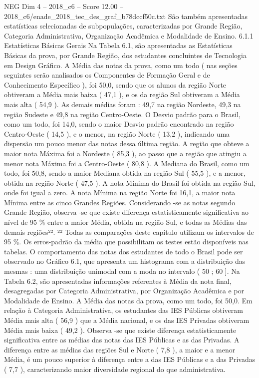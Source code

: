 \begin{textsample}{NEG Dim 4 – 2018\_c6 – Score 12.00 – 2018\_c6/enade\_2018\_tec\_des\_graf\_b78dccf50c.txt}
São também apresentadas estatísticas selecionadas de subpopulações, caracterizadas por Grande Região, Categoria Administrativa, Organização Acadêmica e Modalidade de Ensino. 6.1.1 Estatísticas Básicas Gerais Na Tabela 6.1, são apresentadas as Estatísticas Básicas da prova, por Grande Região, dos estudantes concluintes de Tecnologia em Design Gráfico.
A Média das notas da prova, como um todo ( nas seções seguintes serão analisados os Componentes de Formação Geral e de Conhecimento Específico ), foi 50,0, sendo que os alunos da região Norte obtiveram a Média mais baixa ( 47,1 ), e os da região Sul obtiveram a Média mais alta ( 54,9 ).
As demais médias foram : 49,7 na região Nordeste, 49,3 na região Sudeste e 49,8 na região Centro-Oeste.
O Desvio padrão para o Brasil, como um todo, foi 14,0, sendo o maior Desvio padrão encontrado na região Centro-Oeste ( 14,5 ), e o menor, na região Norte ( 13,2 ), indicando uma dispersão um pouco menor das notas dessa última região.
A região que obteve a maior nota Máxima foi a Nordeste ( 85,3 ), ao passo que a região que atingiu a menor nota Máxima foi a Centro-Oeste ( 80,8 ).
A Mediana do Brasil, como um todo, foi 50,8, sendo a maior Mediana obtida na região Sul ( 55,5 ), e a menor, obtida na região Norte ( 47,5 ).
A nota Mínima do Brasil foi obtida na região Sul, onde foi igual a zero.
A nota Mínima na região Norte foi 16,1, a maior nota Mínima entre as cinco Grandes Regiões.
Considerando -se as notas segundo Grande Região, observa -se que existe diferença estatisticamente significativa ao nível de 95 \% entre a maior Média, obtida na região Sul, e todas as Médias das demais regiões²². ²² Todas as comparações deste capítulo utilizam os intervalos de 95 \%.
Os erros-padrão da média que possibilitam os testes estão disponíveis nas tabelas.
O comportamento das notas dos estudantes de todo o Brasil pode ser observado no Gráfico 6.1, que apresenta um histograma com a distribuição das mesmas : uma distribuição unimodal com a moda no intervalo ( 50 ; 60 ].
Na Tabela 6.2, são apresentadas informações referentes à Média da nota final, desagregadas por Categoria Administrativa, por Organização Acadêmica e por Modalidade de Ensino.
A Média das notas da prova, como um todo, foi 50,0.
Em relação à Categoria Administrativa, os estudantes das IES Públicas obtiveram Média mais alta ( 56,9 ) que a Média nacional, e os das IES Privadas obtiveram Média mais baixa ( 49,2 ).
Observa -se que existe diferença estatisticamente significativa entre as médias das notas das IES Públicas e as das Privadas.
A diferença entre as médias das regiões Sul e Norte ( 7,8 ), a maior e a menor Média, é um pouco superior à diferença entre a das IES Públicas e a das Privadas ( 7,7 ), caracterizando maior diversidade regional do que administrativa.

\end{textsample}
